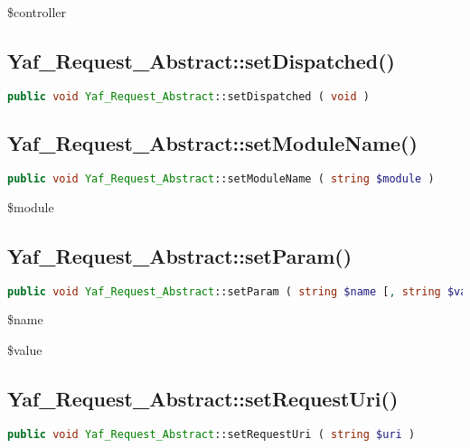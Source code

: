 \begin{compactitem}
\item \$controller
\end{compactitem}

\subsection{Yaf\_Request\_Abstract::setDispatched()}

\begin{lstlisting}[language=PHP]
public void Yaf_Request_Abstract::setDispatched ( void )
\end{lstlisting}


\subsection{Yaf\_Request\_Abstract::setModuleName()}


\begin{lstlisting}[language=PHP]
public void Yaf_Request_Abstract::setModuleName ( string $module )
\end{lstlisting}

\begin{compactitem}
\item \$module
\end{compactitem}



\subsection{Yaf\_Request\_Abstract::setParam()}

\begin{lstlisting}[language=PHP]
public void Yaf_Request_Abstract::setParam ( string $name [, string $value ] )
\end{lstlisting}


\begin{compactitem}
\item \$name
\item \$value
\end{compactitem}



\subsection{Yaf\_Request\_Abstract::setRequestUri()}


\begin{lstlisting}[language=PHP]
public void Yaf_Request_Abstract::setRequestUri ( string $uri )
\end{lstlisting}

